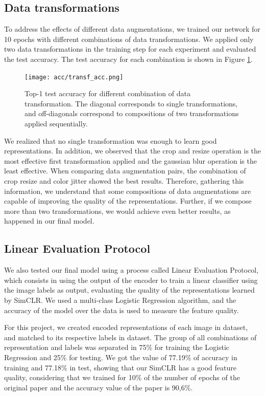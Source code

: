 \documentclass{article}
\begin{document}
\subsection{Data transformations}

To address the effects of different data augmentations, we trained our network for 10 epochs with different combinations of data transformations. We applied only two data transformations in the training step for each experiment and evaluated the test accuracy. The test accuracy for each combination is shown in Figure \ref{fig:transf_acc}. 

\begin{figure}
  \centering
  \texttt{[image: acc/transf\_acc.png]}
  \caption{Top-1 test accuracy for different combination of data transformation. The diagonal corresponds to single transformations, and off-diagonals correspond to compositions of two transformations applied sequentially.}
  \label{fig:transf_acc}
\end{figure}

We realized that no single transformation was enough to learn good representations. In addition, we observed that the crop and resize operation is the most effective first transformation applied and the gaussian blur operation is the least effective. When comparing data augmentation pairs, the combination of crop resize and color jitter showed the best results. Therefore, gathering this information, we understand that some compositions of data augmentations are capable of improving the quality of the representations. Further, if we compose more than two transformations, we would achieve even better results, as happened in our final model.

\subsection{Linear Evaluation Protocol}

We also tested our final model using a process called Linear Evaluation Protocol, which consists in using the output of the encoder to train a linear classifier using the image labels as output, evaluating the quality of the representations learned by SimCLR. We used a multi-class Logistic Regression algorithm, and the accuracy of the model over the data is used to measure the feature quality.

For this project, we created encoded representations of each image in dataset, and matched to its respective labels in dataset. The group of all combinations of representation and labels was separated in 75\% for training the Logistic Regression and 25\% for testing. We got the value of 77.19\% of accuracy in training and 77.18\% in test, showing that our SimCLR has a good feature quality, considering that we trained for 10\% of the number of epochs of the original paper and the accuracy value of the paper is 90,6\%. 
\end{document}
